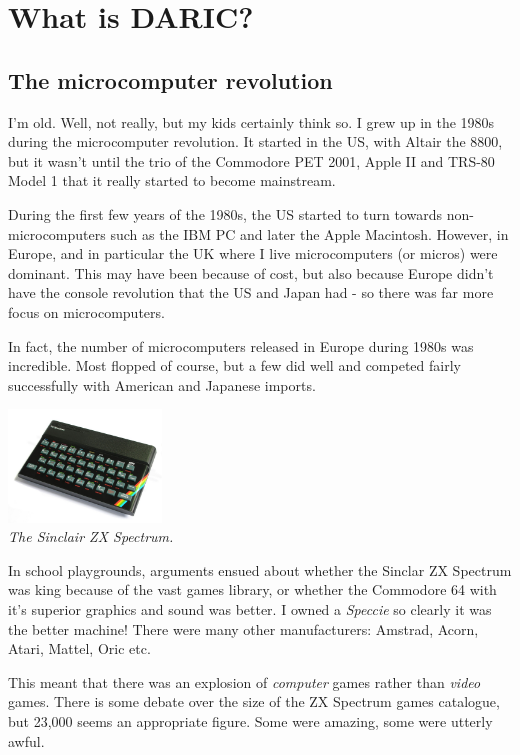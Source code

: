 \documentclass[10pt]{book}
\newcommand{\DARIC}{DARIC}
\begin{document}
\section{What is \DARIC?}

\subsection{The microcomputer revolution}
\par{I'm old. Well, not really, but my kids certainly think so. I grew up in the 1980s during the microcomputer revolution. It started in the US, with Altair the 8800, but it wasn't until the trio of the Commodore PET 2001, Apple II and TRS-80 Model 1 that it really started to become mainstream.}
\par{During the first few years of the 1980s, the US started to turn towards non-microcomputers such as the IBM PC and later the Apple Macintosh. However, in Europe, and in particular the UK where I live microcomputers (or micros) were dominant. This may have been because of cost, but also because Europe didn't have the console revolution that the US and Japan had - so there was far more focus on microcomputers.}
\par{In fact, the number of microcomputers released in Europe during 1980s was incredible. Most flopped of course, but a few did well and competed fairly successfully with American and Japanese imports.}
\begin{center}
\includegraphics[height=3cm]{1200px-ZXSpectrum48k.jpg}\\
\scriptsize{\emph{The Sinclair ZX Spectrum.}}
\end{center}
\par{In school playgrounds, arguments ensued about whether the Sinclar ZX Spectrum was king because of the vast games library, or whether the Commodore 64 with it's superior graphics and sound was better. I owned a \emph{Speccie} so clearly it was the better machine! There were many other manufacturers: Amstrad, Acorn, Atari, Mattel, Oric etc.}
\par{This meant that there was an explosion of \emph{computer} games rather than \emph{video} games. There is some debate over the size of the ZX Spectrum games catalogue, but 23,000 seems an appropriate figure. Some were amazing, some were utterly awful.}
\end{document}
